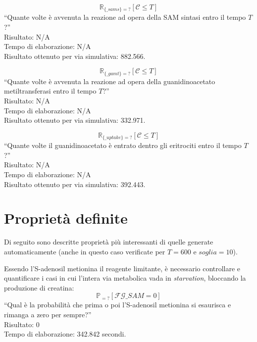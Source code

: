 \begin{equation}
	\mathbb{R}_{\{\_sams\}=?} [ \mathcal{C} \leq T ]
\end{equation}
``Quante volte \`e avvenuta la reazione ad opera della SAM sintasi entro il tempo $T$?''\\
Risultato: N/A\\
Tempo di elaborazione: N/A\\
Risultato ottenuto per via simulativa: 882.566.

\begin{equation}
	\mathbb{R}_{\{\_gamt\}=?} [ \mathcal{C} \leq T ]
\end{equation}
``Quante volte \`e avvenuta la reazione ad opera della guanidinoacetato metiltransferasi entro il tempo $T$?''\\
Risultato: N/A\\
Tempo di elaborazione: N/A\\
Risultato ottenuto per via simulativa: 332.971.

\begin{equation}
	\mathbb{R}_{\{\_uptake\}=?} [ \mathcal{C} \leq T ]
\end{equation}
``Quante volte il guanidinoacetato \`e entrato dentro gli eritrociti entro il tempo $T$?''\\
Risultato: N/A\\
Tempo di elaborazione: N/A\\
Risultato ottenuto per via simulativa: 392.443.

\section{Propriet\`a definite}\label{sez:propcustom}
Di seguito sono descritte propriet\`a pi\`u interessanti di quelle generate automaticamente (anche in questo caso verificate per $T = 600$ e $soglia = 10$).

Essendo l'S-adenosil metionina il reagente limitante, \`e necessario controllare e quantificare i casi in cui l'intera via metabolica vada in \emph{starvation}, bloccando la produzione di creatina:
\begin{equation}
\mathbb{P}_{=?} [\mathcal{F} \mathcal{G} \_SAM = 0]
\end{equation}
``Qual \`e la probabilit\`a che prima o poi l'S-adenosil metionina si esaurisca e rimanga a zero per sempre?''\\
Risultato: 0\\
Tempo di elaborazione: 342.842 secondi.

